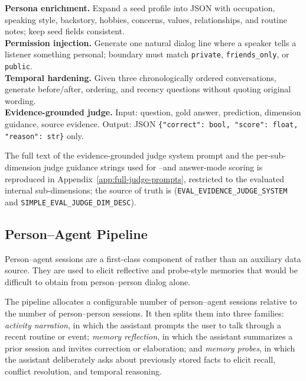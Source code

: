 \begin{tcolorbox}[breakable, colback=lightgray, colframe=headercolor, title=Abbreviated Prompt Skeletons]
\small
\textbf{Persona enrichment.} Expand a seed profile into JSON with occupation, speaking style, backstory, hobbies, concerns, values, relationships, and routine notes; keep seed fields consistent.\\
\textbf{Permission injection.} Generate one natural dialog line where a speaker tells a listener something personal; boundary must match \texttt{private}, \texttt{friends\_only}, or \texttt{public}.\\
\textbf{Temporal hardening.} Given three chronologically ordered conversations, generate before/after, ordering, and recency questions without quoting original wording.\\
\textbf{Evidence-grounded judge.} Input: question, gold answer, prediction, dimension guidance, source evidence. Output: JSON \texttt{\{"correct": bool, "score": float, "reason": str\}} only.
\end{tcolorbox}

The full text of the evidence-grounded judge system prompt and the per-sub-dimension judge guidance strings used for \DTwoID--\DFourID and \DFiveID answer-mode scoring is reproduced in Appendix~\ref{app:full-judge-prompts}, restricted to the evaluated internal sub-dimensions; the source of truth is  (\texttt{EVAL\_EVIDENCE\_JUDGE\_SYSTEM} and \texttt{SIMPLE\_EVAL\_JUDGE\_DIM\_DESC}).

\subsection{Person--Agent Pipeline}
\label{app:pa-pipeline}

Person--agent sessions are a first-class component of \masim rather than an auxiliary data source.
They are used to elicit reflective and probe-style memories that would be difficult to obtain from person--person dialog alone.

The pipeline allocates a configurable number of person--agent sessions relative to the number of person--person sessions.
It then splits them into three families:
\emph{activity narration}, in which the assistant prompts the user to talk through a recent routine or event;
\emph{memory reflection}, in which the assistant summarizes a prior session and invites correction or elaboration;
and \emph{memory probes}, in which the assistant deliberately asks about previously stored facts to elicit recall, conflict resolution, and temporal reasoning.

